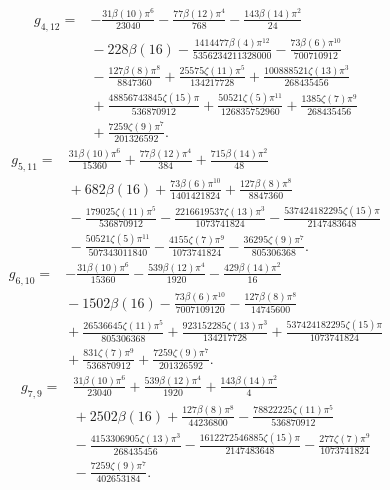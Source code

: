 \begin{align*}g_{4,12}={}&- \frac{31 \beta(10) \pi^{6}}{23040}- \frac{77 \beta(12) \pi^{4}}{768}- \frac{143 \beta(14) \pi^{2}}{24}\\
&{}- 228 \beta(16)- \frac{1414477 \beta(4) \pi^{12}}{5356234211328000}- \frac{73 \beta(6) \pi^{10}}{700710912}\\
&{}- \frac{127 \beta(8) \pi^{8}}{8847360}+\frac{25575 \zeta(11) \pi^{5}}{134217728}+\frac{100888521 \zeta(13) \pi^{3}}{268435456}\\
&{}+\frac{48856743845 \zeta(15) \pi}{536870912}+\frac{50521 \zeta(5) \pi^{11}}{126835752960}+\frac{1385 \zeta(7) \pi^{9}}{268435456}\\
&{}+\frac{7259 \zeta(9) \pi^{7}}{201326592}.\end{align*}
\begin{align*}g_{5,11}={}&\frac{31 \beta(10) \pi^{6}}{15360}+\frac{77 \beta(12) \pi^{4}}{384}+\frac{715 \beta(14) \pi^{2}}{48}\\
&{}+682 \beta(16)+\frac{73 \beta(6) \pi^{10}}{1401421824}+\frac{127 \beta(8) \pi^{8}}{8847360}\\
&{}- \frac{179025 \zeta(11) \pi^{5}}{536870912}- \frac{2216619537 \zeta(13) \pi^{3}}{1073741824}- \frac{537424182295 \zeta(15) \pi}{2147483648}\\
&{}- \frac{50521 \zeta(5) \pi^{11}}{507343011840}- \frac{4155 \zeta(7) \pi^{9}}{1073741824}- \frac{36295 \zeta(9) \pi^{7}}{805306368}.\end{align*}
\begin{align*}g_{6,10}={}&- \frac{31 \beta(10) \pi^{6}}{15360}- \frac{539 \beta(12) \pi^{4}}{1920}- \frac{429 \beta(14) \pi^{2}}{16}\\
&{}- 1502 \beta(16)- \frac{73 \beta(6) \pi^{10}}{7007109120}- \frac{127 \beta(8) \pi^{8}}{14745600}\\
&{}+\frac{26536645 \zeta(11) \pi^{5}}{805306368}+\frac{923152285 \zeta(13) \pi^{3}}{134217728}+\frac{537424182295 \zeta(15) \pi}{1073741824}\\
&{}+\frac{831 \zeta(7) \pi^{9}}{536870912}+\frac{7259 \zeta(9) \pi^{7}}{201326592}.\end{align*}
\begin{align*}g_{7,9}={}&\frac{31 \beta(10) \pi^{6}}{23040}+\frac{539 \beta(12) \pi^{4}}{1920}+\frac{143 \beta(14) \pi^{2}}{4}\\
&{}+2502 \beta(16)+\frac{127 \beta(8) \pi^{8}}{44236800}- \frac{78822225 \zeta(11) \pi^{5}}{536870912}\\
&{}- \frac{4153306905 \zeta(13) \pi^{3}}{268435456}- \frac{1612272546885 \zeta(15) \pi}{2147483648}- \frac{277 \zeta(7) \pi^{9}}{1073741824}\\
&{}- \frac{7259 \zeta(9) \pi^{7}}{402653184}.\end{align*}
